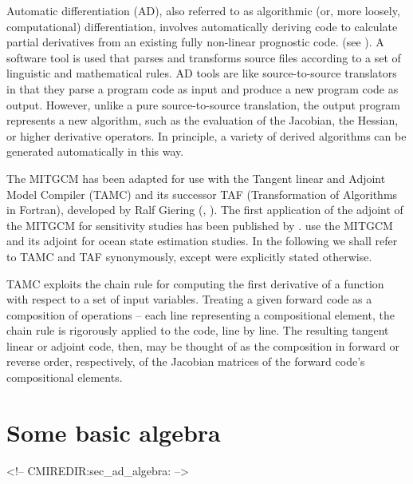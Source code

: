 
{\sf Automatic differentiation} (AD), also referred to as algorithmic
(or, more loosely, computational) differentiation, involves 
automatically deriving code to calculate
partial derivatives from an existing fully non-linear prognostic code.
(see \cite{gri:00}).
A software tool is used that parses and transforms source files 
according to a set of linguistic and mathematical rules. 
AD tools are like source-to-source translators in that
they parse a program code as input and produce a new program code 
as output.
However, unlike a pure source-to-source translation, the output program
represents a new algorithm, such as the evaluation of the
Jacobian, the Hessian, or higher derivative operators.
In principle, a variety of derived algorithms
can be generated automatically in this way.

The MITGCM has been adapted for use with the
Tangent linear and Adjoint Model Compiler (TAMC) and its successor TAF
(Transformation of Algorithms in Fortran), developed
by Ralf Giering (\cite{gie-kam:98}, \cite{gie:99,gie:00}).
The first application of the adjoint of the MITGCM for sensitivity
studies has been published by \cite{maro-eta:99}.
\cite{sta-eta:97,sta-eta:01} use the MITGCM and its adjoint
for ocean state estimation studies.
In the following we shall refer to TAMC and TAF synonymously,
except were explicitly stated otherwise.

TAMC exploits the chain rule for computing the first
derivative of a function with
respect to a set of input variables. 
Treating a given forward code as a composition of operations --
each line representing a compositional element, the chain rule is
rigorously applied to the code, line by line. The resulting 
tangent linear or adjoint code,
then, may be thought of as the composition in 
forward or reverse order, respectively, of the
Jacobian matrices of the forward code's compositional elements.

\section{Some basic algebra}
\label{sec_ad_algebra}
\begin{rawhtml}
<!-- CMIREDIR:sec_ad_algebra: -->
\end{rawhtml}


